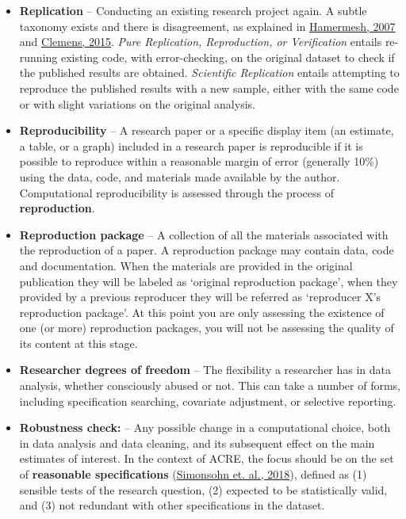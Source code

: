 \documentclass[]{book}
\begin{document}
\begin{itemize}
\item
  \textbf{Replication} -- Conducting an existing research project again. A subtle taxonomy exists and there is disagreement, as explained in \href{https://poseidon01.ssrn.com/delivery.php?ID=730022068104120012124069127117116094125005035067064043105083109027064120011088086109059117052062000025007012029080123125089014014006079063116014095000023071022077006017094093005117096083119073115079022110105075073085121117103030106102080005099007\&EXT=pdf}{Hamermesh, 2007} and \href{https://www.cgdev.org/sites/default/files/CGD-Working-Paper-399-Clemens-Meaning-Failed-Replications.pdf}{Clemens, 2015}. \emph{Pure Replication, Reproduction, or Verification} entails re-running existing code, with error-checking, on the original dataset to check if the published results are obtained. \emph{Scientific Replication} entails attempting to reproduce the published results with a new sample, either with the same code or with slight variations on the original analysis.
\item
  \textbf{Reproducibility} -- A research paper or a specific display item (an estimate, a table, or a graph) included in a research paper is reproducible if it is possible to reproduce within a reasonable margin of error (generally 10\%) using the data, code, and materials made available by the author. Computational reproducibility is assessed through the process of \textbf{reproduction}.
\item
  \textbf{Reproduction package} -- A collection of all the materials associated with the reproduction of a paper. A reproduction package may contain data, code and documentation. When the materials are provided in the original publication they will be labeled as `original reproduction package', when they provided by a previous reproducer they will be referred as `reproducer X's reproduction package'. At this point you are only assessing the existence of one (or more) reproduction packages, you will not be assessing the quality of its content at this stage.
\item
  \textbf{Researcher degrees of freedom} -- The flexibility a researcher has in data analysis, whether consciously abused or not. This can take a number of forms, including specification searching, covariate adjustment, or selective reporting.
\item
  \textbf{Robustness check:} -- Any possible change in a computational choice, both in data analysis and data cleaning, and its subsequent effect on the main estimates of interest. In the context of ACRE, the focus should be on the set of \textbf{reasonable specifications} (\href{https://urisohn.com/sohn_files/wp/wordpress/wp-content/uploads/Paper-Specification-curve-2018-11-02.pdf}{Simonsohn et. al., 2018}), defined as (1) sensible tests of the research question, (2) expected to be statistically valid, and (3) not redundant with other specifications in the dataset.

\end{itemize}
\end{document}
